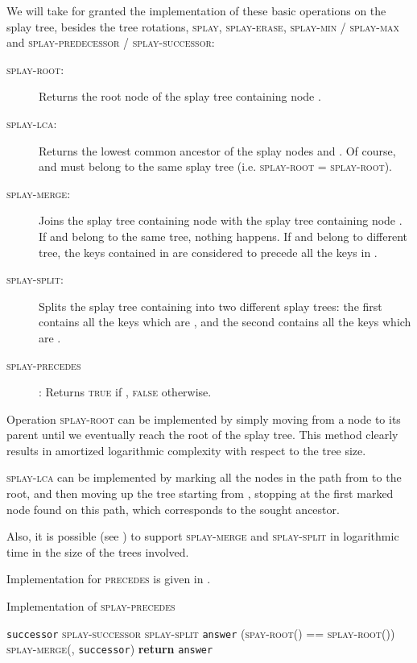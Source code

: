 \documentclass[a4paper,USenglish]{lipics}
\newcommand{\var}[1]{\textrm{\texttt{#1}}}
\begin{document}
		We will take for granted the implementation of these basic operations on the splay tree, besides the  tree rotations, \textsc{splay}, \textsc{splay-erase}, \textsc{splay-min} / \textsc{splay-max} and \textsc{splay-predecessor} / \textsc{splay-successor}:
		\begin{description}
			\item[\textsc{splay-root}:] Returns the root node of the splay tree containing node .
			
			\item[\textsc{splay-lca}:] Returns the lowest common ancestor of the splay nodes  and . Of course,  and  must belong to the same splay tree (i.e. \textsc{splay-root} = \textsc{splay-root}).
			
			\item[\textsc{splay-merge}:] Joins the splay tree  containing node  with the splay tree  containing node . If  and  belong to the same tree, nothing happens. If  and  belong to different tree, the keys contained in  are considered to precede all the keys in .
			
			\item[\textsc{splay-split}:] Splits the splay tree  containing  into two different splay trees: the first contains all the keys which are , and the second contains all the keys which are .
			
			\item[\textsc{splay-precedes}]: Returns \textsc{true} if , \textsc{false} otherwise.
		\end{description}
		Operation \textsc{splay-root} can be implemented by simply moving from a node to its parent until we eventually reach the root of the splay tree. This method clearly results in amortized logarithmic complexity with respect to the tree size.
		
		\textsc{splay-lca} can be implemented by marking all the nodes in the path from  to the root, and then moving up the tree starting from , stopping at the first marked node found on this path, which corresponds to the sought ancestor.
		
Also, it is possible   (see \cite{GKSTW11})  to support \textsc{splay-merge} and \textsc{splay-split} in logarithmic time in the size of the trees involved.
		
		Implementation for \textsc{precedes} is given in .
		\begin{algorithm}[H]
		  \small
		  \caption{\small Implementation of \textsc{splay-precedes}}
		  \label{algo:precedes}
		  \begin{algorithmic}[1]
		    \State \var{successor}  \textsc{splay-successor}
			\State \textsc{splay-split}
			\State \var{answer}  (\textsc{spay-root}() == \textsc{splay-root}())
			\If{\var{successor}  \textsc{null}}
				\State \textsc{splay-merge}(, \var{successor})
			\EndIf
			\State \textbf{return} \var{answer}
		    \EndProcedure
		  \end{algorithmic}
		\end{algorithm}
		
\end{document}
